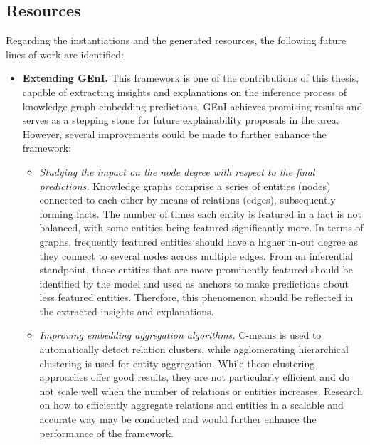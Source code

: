 


\subsection*{Resources}
Regarding the instantiations and the generated resources, the following future lines of work are identified:
\begin{itemize}
    \item \textbf{Extending GEnI.} This framework is one of the contributions of this thesis, capable of extracting insights and explanations on the inference process of knowledge graph embedding predictions. GEnI achieves promising results and serves as a stepping stone for future explainability proposals in the area. However, several improvements could be made to further enhance the framework:
    \begin{itemize}
        \item \textit{Studying the impact on the node degree with respect to the final predictions.} Knowledge graphs comprise a series of entities (nodes) connected to each other by means of relations (edges), subsequently forming facts. The number of times each entity is featured in a fact is not balanced, with some entities being featured significantly more. In terms of graphs, frequently featured entities should have a higher in-out degree as they connect to several nodes across multiple edges. From an inferential standpoint, those entities that are more prominently featured should be identified by the model and used as anchors to make predictions about less featured entities. Therefore, this phenomenon should be reflected in the extracted insights and explanations.
        \item \textit{Improving embedding aggregation algorithms.} C-means is used to automatically detect relation clusters, while agglomerating hierarchical clustering is used for entity aggregation. While these clustering approaches offer good results, they are not particularly efficient and do not scale well when the number of relations or entities increases. Research on how to efficiently aggregate relations and entities in a scalable and accurate way may be conducted and would further enhance the performance of the framework.

\end{itemize}
\end{itemize}
